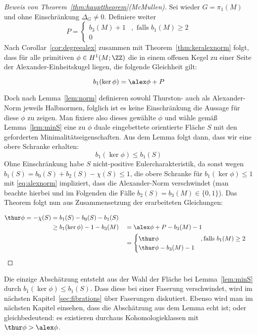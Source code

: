 \begin{proof}[Beweis von Theorem~\ref{thm:haupttheorem}(McMullen)]
	Sei wieder $G=\pi_1(M)$ und ohne Einschränkung $\Delta_G\neq 0$. Definiere weiter \[
	P=\begin{cases}
		b_3(M)+1 &, \text{ falls } b_1(M) \geq 2	\\
		0
	\end{cases}
	\]	
	Nach Corollar~\ref{cor:degreealex} zusammen mit Theorem~\ref{thm:keralexnorm} folgt, dass für alle primitiven $\phi \in H^1(M;\ZZ)$ die in einem offenen Kegel zu einer Seite der Alexander-Einheitskugel liegen, die folgende Gleichheit gilt:
	
		\begin{equation}
		b_1(\ker\phi)= \alex \phi + P \label{eq:alexnorm}
		\end{equation}
	
	Doch nach Lemma~\ref{lem:norm} definieren sowohl Thurston- auch als Alexander-Norm jeweils Halbnormen, folglich ist es keine Einschränkung die Aussage für diese $\phi$ zu zeigen. Man fixiere also dieses gewählte $\phi$ und wähle gemäß Lemma~\ref{lem:minS} eine zu $\phi$ duale eingebettete orientierte Fläche $S$ mit den geforderten Minimalitätseigenschaften. Aus dem Lemma folgt dann, dass wir eine obere Schranke erhalten:
	\begin{equation}
		b_1(\ker\phi) \leq b_1(S) \label{eq:obereSchrankeS}
	\end{equation}
	Ohne Einschränkung habe $S$ nicht-positive Eulercharakteristik, da sonst wegen $b_1(S)= b_0(S) + b_2(S) - \chi(S) \leq 1$, die obere Schranke für $b_1(\ker\phi)\leq 1$  mit \eqref{eq:alexnorm} impliziert, dass die Alexander-Norm verschwindet (man beachte hierbei und im Folgenden die Fälle $b_2(S)=b_3(M) \in \{0,1\}$). Das Theorem folgt nun aus Zusammensetzung der erarbeiteten Gleichungen:
	
		\begin{align*}
		\thur \phi = -\chi(S) &= b_1(S)-b_0(S)-b_1(S)\\
					&\geq b_1(\ker\phi) -1-b_3(M) &&= \alex \phi +P -b_3(M)-1\\
					&&& = \begin{cases}
						\thur \phi &, \text{falls } b_1(M)\geq 2\\
						\thur \phi -b_3(M)-1
					\end{cases}
		\end{align*}
\end{proof} 
	Die einzige Abschätzung entsteht aus der Wahl der Fläche bei Lemma~\ref{lem:minS} durch $b_1(\ker\phi)\leq b_1(S)$. Dass diese bei einer Faserung verschwindet, wird im nächsten Kapitel~\ref{sec:fibrations} über Faserungen diskutiert. Ebenso wird man im nächsten Kapitel einsehen, dass die Abschätzung aus dem Lemma echt ist; oder gleichbedeutend: es existieren durchaus Kohomologieklassen mit $\thur \phi > \alex \phi$.